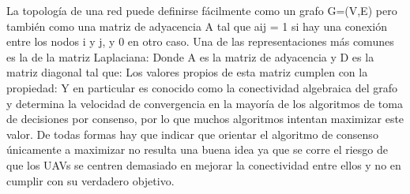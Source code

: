 La topología de una red puede definirse fácilmente como un grafo G=(V,E) pero también como una matriz de adyacencia A tal que aij = 1 si hay una conexión entre los nodos i y j, y 0 en otro caso. Una de las representaciones más comunes es la de la matriz Laplaciana: 
Donde A es la matriz de adyacencia y D es la matriz diagonal tal que:
Los valores propios de esta matriz cumplen con la propiedad:
Y en particular  es conocido como la conectividad algebraica del grafo y determina la velocidad de convergencia en la mayoría de los algoritmos de toma de decisiones por consenso, por lo que muchos algoritmos intentan maximizar este valor. De todas formas hay que indicar que orientar el algoritmo de consenso únicamente a maximizar  no resulta una buena idea ya que se corre el riesgo de que los UAVs se centren demasiado en mejorar la conectividad entre ellos y no en cumplir con su verdadero objetivo.
